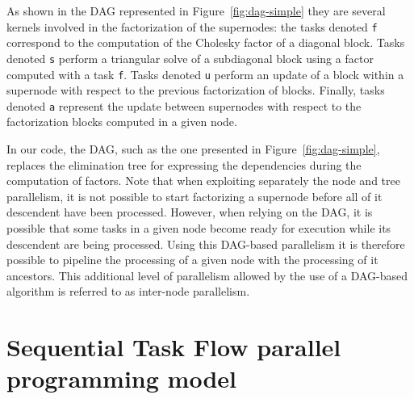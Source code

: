 \documentclass{article}
\begin{document}
As shown in the DAG represented in Figure~\ref{fig:dag-simple} they
are several kernels involved in the factorization of the supernodes:
the tasks denoted \texttt{f} correspond to the computation of the
Cholesky factor of a diagonal block. Tasks denoted \texttt{s} perform
a triangular solve of a subdiagonal block using a factor computed with
a task \texttt{f}. Tasks denoted \texttt{u} perform an update of a
block within a supernode with respect to the previous factorization of
blocks. Finally, tasks denoted \texttt{a} represent the update between
supernodes with respect to the factorization blocks computed in a
given node. 

In our code, the DAG, such as the one presented in
Figure~\ref{fig:dag-simple}, replaces the elimination tree for
expressing the dependencies during the computation of factors. Note
that when exploiting separately the node and tree parallelism, it is
not possible to start factorizing a supernode before all of it
descendent have been processed. However, when relying on the DAG, it
is possible that some tasks in a given node become ready for execution
while its descendent are being processed. Using this DAG-based
parallelism it is therefore possible to pipeline the processing of a
given node with the processing of it ancestors. This additional level
of parallelism allowed by the use of a DAG-based algorithm is referred
to as inter-node parallelism.
 
\section{Sequential Task Flow parallel programming model}\label{sec:runtime}
\end{document}
